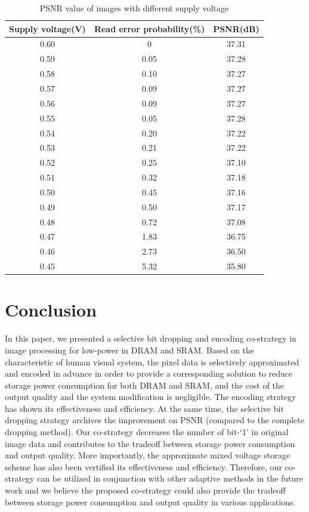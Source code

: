 \documentclass[lettersize,journal]{IEEEtran}
\begin{document}
\begin{table} 
\begin{center} 
\caption{PSNR value of images with different supply voltage} 
\label{tab1} 
\begin{tabular}{| c | c | c |} 
\hline 
Supply voltage(V) & Read error probability(\%) & 
PSNR(dB)\\
\hline 
0.60& 0 
& 37.31\\ 
\hline
0.59& 0.05 
& 37.28\\
\hline 
0.58& 0.10 
& 37.27\\ 
\hline
0.57& 0.09
& 37.27\\ 
\hline
0.56& 0.09 
& 37.27\\ 
\hline
0.55& 0.05 
& 37.28\\ 
\hline
0.54& 0.20 
& 37.22\\ 
\hline
0.53& 0.21 
& 37.22\\ 
\hline
0.52& 0.25 
& 37.10\\ 
\hline
0.51& 0.32 
& 37.18\\ 
\hline
0.50& 0.45 
& 37.16\\ 
\hline
0.49& 0.50 
& 37.17\\ 
\hline
0.48& 0.72 
& 37.08\\ 
\hline
0.47& 1.83 
& 36.75\\ 
\hline
0.46& 2.73 
& 36.50\\ 
\hline
0.45& 5.32 
& 35.80\\ 
\hline
\end{tabular} 
\end{center} 
\end{table}
\section{Conclusion} \label{sec5}
In this paper, we presented a selective bit dropping and encoding co-strategy in image processing for low-power in DRAM and SRAM. Based on the characteristic of human visual system, the pixel data is selectively approximated and encoded in advance in order to provide a corresponding solution to reduce storage power consumption for both DRAM and SRAM, and the cost of the output quality and the system modification is negligible. The encoding strategy has shown its effectiveness and efficiency. At the same time, the selective bit dropping strategy archives the improvement on PSNR (compared to the complete dropping method). Our co-strategy decreases the number of bit-`1’ in original image data and contributes to the tradeoff between storage power consumption and output quality. More importantly, the approximate mixed voltage storage scheme has also been vertified its effectiveness and efficiency. Therefore, our co-strategy can be utilized in conjunction with other adaptive methods in the future work and we believe the proposed co-strategy could also provide the tradeoff between storage power consumption and output quality in various applications.
\end{document}
